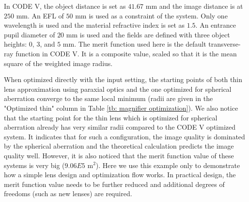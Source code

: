 In CODE V, the object distance is set as $41.67 $ mm and the image distance is at $250 $ mm. An EFL of $50 $ mm is used as a constraint of the system. Only one wavelength is used and the material refractive index is set as $1.5$. An entrance pupil diameter of $20 $ mm is used and the fields are defined with three object heights: $0$, $3$, and $5 $ mm.  The merit function used here is the default transverse-ray function in CODE V. It is a composite value, scaled so that it is the mean square of the weighted image radius.

When optimized directly with the input setting, the starting points of both thin lens approximation using paraxial optics and the one optimized for spherical aberration converge to the same local minimum (radii are given in the "Optimized thin" column in Table \ref{tb: magnifier optimization}). We also notice that the starting point for the thin lens which is optimized for spherical aberration already has very similar radii compared to the CODE V optimized system. It indicates that for such a configuration, the image quality is dominated by the spherical aberration and the theoretical calculation predicts the image quality well. However, it is also noticed that the merit function value of these systems is very big ($9.06E5$ \textmu m$^{2}$). Here we use this example only to demonstrate how a simple lens design and optimization flow works. In practical design, the merit function value needs to be further reduced and additional degrees of freedoms (such as new lenses) are required. 


